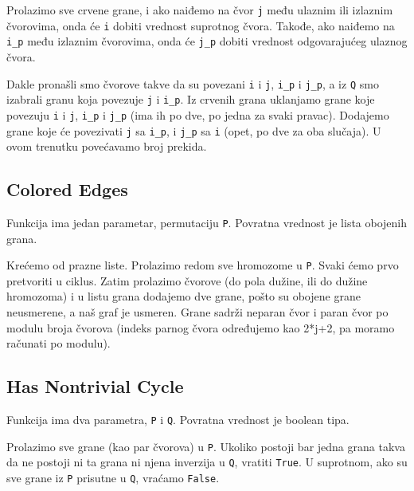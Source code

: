 Prolazimo sve crvene grane, i ako naiđemo na čvor \texttt{j} među ulaznim ili izlaznim čvorovima, onda će \texttt{i} dobiti vrednost suprotnog čvora. Takođe, ako naiđemo na \texttt{i\_p} među izlaznim čvorovima, onda će \texttt{j\_p} dobiti vrednost odgovarajućeg ulaznog čvora.

Dakle pronašli smo čvorove takve da su povezani \texttt{i} i \texttt{j}, \texttt{i\_p} i \texttt{j\_p}, a iz \texttt{Q} smo izabrali granu koja povezuje \texttt{j} i \texttt{i\_p}. Iz crvenih grana uklanjamo grane koje povezuju \texttt{i} i \texttt{j}, \texttt{i\_p} i \texttt{j\_p} (ima ih po dve, po jedna za svaki pravac). Dodajemo grane koje će povezivati \texttt{j} sa \texttt{i\_p}, i \texttt{j\_p} sa \texttt{i} (opet, po dve za oba slučaja). U ovom trenutku povećavamo broj prekida.







\subsection{Colored Edges}
\label{coloredEdges}

Funkcija ima jedan parametar, permutaciju \texttt{P}. Povratna vrednost je lista obojenih grana.

Krećemo od prazne liste. Prolazimo redom sve hromozome u \texttt{P}. Svaki ćemo prvo pretvoriti u ciklus. Zatim prolazimo čvorove (do pola dužine, ili do dužine hromozoma) i u listu grana dodajemo dve grane, pošto su obojene grane neusmerene, a naš graf je usmeren. Grane sadrži neparan čvor i paran čvor po modulu broja čvorova (indeks parnog čvora određujemo kao 2*j+2, pa moramo računati po modulu).



\subsection{Has Nontrivial Cycle}
\label{hasNontrivialCycle}

Funkcija ima dva parametra, \texttt{P} i \texttt{Q}. Povratna vrednost je boolean tipa.

Prolazimo sve grane (kao par čvorova) u \texttt{P}. Ukoliko postoji bar jedna grana takva da ne postoji ni ta grana ni njena inverzija u \texttt{Q}, vratiti \texttt{True}. U suprotnom, ako su sve grane iz \texttt{P} prisutne u \texttt{Q}, vraćamo \texttt{False}.

